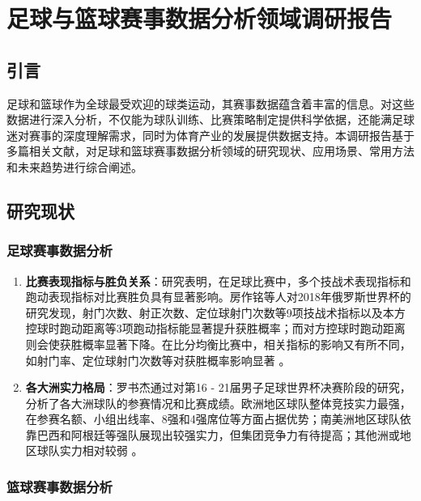 \documentclass[UTF8]{ctexart}
\begin{document}
\newpage
\section{足球与篮球赛事数据分析领域调研报告}\label{ux8db3ux7403ux4e0eux7beeux7403ux8d5bux4e8bux6570ux636eux5206ux6790ux9886ux57dfux8c03ux7814ux62a5ux544a}

\subsection{引言}\label{ux4e00ux5f15ux8a00}

足球和篮球作为全球最受欢迎的球类运动，其赛事数据蕴含着丰富的信息。对这些数据进行深入分析，不仅能为球队训练、比赛策略制定提供科学依据，还能满足球迷对赛事的深度理解需求，同时为体育产业的发展提供数据支持。本调研报告基于多篇相关文献，对足球和篮球赛事数据分析领域的研究现状、应用场景、常用方法和未来趋势进行综合阐述。

\subsection{研究现状}\label{ux4e8cux7814ux7a76ux73b0ux72b6}

\subsubsection{足球赛事数据分析}\label{ux4e00uxff09ux8db3ux7403ux8d5bux4e8bux6570ux636eux5206ux6790}

\begin{enumerate}
\def\labelenumi{\arabic{enumi}.}
\item
  \textbf{比赛表现指标与胜负关系}：研究表明，在足球比赛中，多个技战术表现指标和跑动表现指标对比赛胜负具有显著影响。房作铭等人对2018年俄罗斯世界杯的研究发现，射门次数、射正次数、定位球射门次数等9项技战术指标以及本方控球时跑动距离等3项跑动指标能显著提升获胜概率；而对方控球时跑动距离则会使获胜概率显著下降。在比分均衡比赛中，相关指标的影响又有所不同，如射门率、定位球射门次数等对获胜概率影响显著
  。
\item
  \textbf{各大洲实力格局}：罗书杰通过对第16 -
  21届男子足球世界杯决赛阶段的研究，分析了各大洲球队的参赛情况和比赛成绩。欧洲地区球队整体竞技实力最强，在参赛名额、小组出线率、8强和4强席位等方面占据优势；南美洲地区球队依靠巴西和阿根廷等强队展现出较强实力，但集团竞争力有待提高；其他洲或地区球队实力相对较弱
  。
\end{enumerate}

\subsubsection{篮球赛事数据分析}\label{ux4e8cuxff09ux7beeux7403ux8d5bux4e8bux6570ux636eux5206ux6790}
\end{document}
